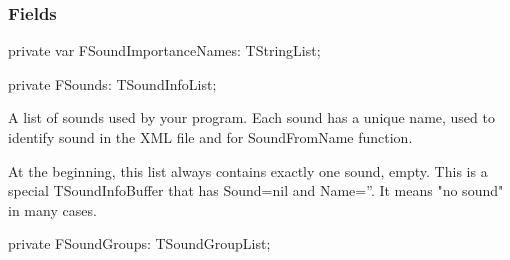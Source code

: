 \documentclass{report}
\newif\ifpdf
\begin{document}
\subsubsection*{\large{\textbf{Fields}}\normalsize\hspace{1ex}\hfill}
\begin{list}{}{
\setlength{\itemindent}{0cm}
\setlength{\listparindent}{0cm}
\setlength{\leftmargin}{\evensidemargin}
\addtolength{\leftmargin}{\tmplength}
\settowidth{\labelsep}{X}
\addtolength{\leftmargin}{\labelsep}
\setlength{\labelwidth}{\tmplength}
}
\label{ok_nested_1.TRepoSoundEngine-FSoundImportanceNames}
\item[\textbf{FSoundImportanceNames}\hfill]
\ifpdf
\begin{flushleft}
\fi
\begin{ttfamily}
private var FSoundImportanceNames: TStringList;\end{ttfamily}

\ifpdf
\end{flushleft}
\fi


\par  \label{ok_nested_1.TRepoSoundEngine-FSounds}
\item[\textbf{FSounds}\hfill]
\ifpdf
\begin{flushleft}
\fi
\begin{ttfamily}
private FSounds: TSoundInfoList;\end{ttfamily}

\ifpdf
\end{flushleft}
\fi


\par A list of sounds used by your program. Each sound has a unique name, used to identify sound in the XML file and for SoundFromName function.

At the beginning, this list always contains exactly one sound, empty. This is a special TSoundInfoBuffer that has Sound=nil and Name=''. It means "no sound" in many cases.\label{ok_nested_1.TRepoSoundEngine-FSoundGroups}
\item[\textbf{FSoundGroups}\hfill]
\ifpdf
\begin{flushleft}
\fi
\begin{ttfamily}
private FSoundGroups: TSoundGroupList;\end{ttfamily}

\ifpdf
\end{flushleft}
\fi



\end{list}
\end{document}
